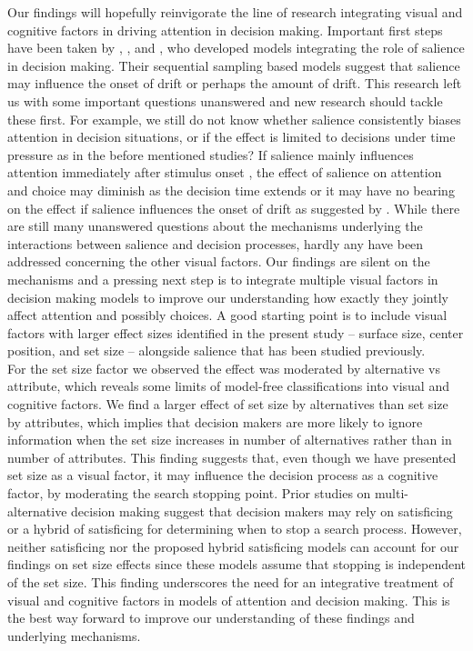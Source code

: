 \documentclass[english,natbib,man,floatsintext]{apa6}
\begin{document}
Our findings will hopefully reinvigorate the line of research integrating visual and cognitive factors in driving attention in decision making. Important first steps have been taken by \cite{chen2013}, \cite{navalpakkam2010}, and \cite{towal2013a}, who developed models integrating the role of salience in decision making. Their sequential sampling based models suggest that salience may influence the onset of drift or perhaps the amount of drift. This research left us with some important questions unanswered and new research should tackle these first. For example, we still do not know whether salience consistently biases attention in decision situations, or if the effect is limited to decisions under time pressure as in the before mentioned studies? If salience mainly influences attention immediately after stimulus onset \citep{theeuwes2010, orquin2015a}, the effect of salience on attention and choice may diminish as the decision time extends or it may have no bearing on the effect if salience influences the onset of drift as suggested by \cite{chen2013}. While there are still many unanswered questions about the mechanisms underlying the interactions between salience and decision processes, hardly any have been addressed concerning the other visual factors. Our findings are silent on the mechanisms and a pressing next step is to integrate multiple visual factors in decision making models to improve our understanding how exactly they jointly affect attention and possibly choices. A good starting point is to include visual factors with larger effect sizes identified in the present study -- surface size, center position, and set size -- alongside salience that has been studied previously.\\     

For the set size factor we observed the effect was moderated by alternative vs attribute, which reveals some limits of model-free classifications into visual and cognitive factors. We find a larger effect of set size by alternatives than set size by attributes, which implies that decision makers are more likely to ignore information when the set size increases in number of alternatives rather than in number of attributes. This finding suggests that, even though we have presented set size as a visual factor, it may influence the decision process as a cognitive factor, by moderating the search stopping point. Prior studies on multi-alternative decision making \cite{reutskaja2011, stuttgen2012, thomas2020} suggest that decision makers may rely on satisficing or a hybrid of satisficing for determining when to stop a search process. However, neither satisficing nor the proposed hybrid satisficing models can account for our findings on set size effects since these models assume that stopping is independent of the set size. This finding underscores the need for an integrative treatment of visual and cognitive factors in models of attention and decision making. This is the best way forward to improve our understanding of these findings and underlying mechanisms.\\
\end{document}
